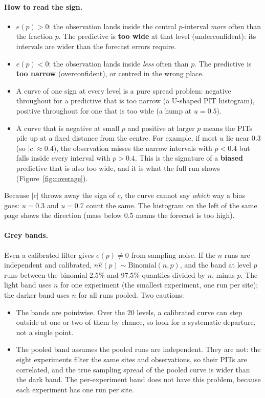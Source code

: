 \documentclass[11pt]{article}
\begin{document}
\paragraph{How to read the sign.}
\begin{itemize}
  \item $e(p) > 0$: the observation lands inside the central $p$-interval \emph{more}
  often than the fraction $p$. The predictive is \textbf{too wide} at that level
  (underconfident): its intervals are wider than the forecast errors require.
  \item $e(p) < 0$: the observation lands inside \emph{less} often than $p$. The
  predictive is \textbf{too narrow} (overconfident), or centred in the wrong place.
  \item A curve of one sign at every level is a pure spread problem: negative throughout
  for a predictive that is too narrow (a U-shaped PIT histogram), positive throughout for
  one that is too wide (a hump at $u = 0.5$).
  \item A curve that is negative at small $p$ and positive at larger $p$ means the PITs
  pile up at a fixed distance from the centre. For example, if most $u$ lie near $0.3$
  (so $|c| \approx 0.4$), the observation misses the narrow intervals with $p < 0.4$ but
  falls inside every interval with $p > 0.4$. This is the signature of a \textbf{biased}
  predictive that is also too wide, and it is what the full run shows (Figure~\ref{fig:coverage}).
\end{itemize}
Because $|c|$ throws away the sign of $c$, the curve cannot say \emph{which} way a bias
goes: $u = 0.3$ and $u = 0.7$ count the same. The histogram on the left of the same page
shows the direction (mass below $0.5$ means the forecast is too high).

\paragraph{Grey bands.} Even a calibrated filter gives $e(p) \neq 0$ from sampling
noise. If the $n$ runs are independent and calibrated, $n\hat\kappa(p) \sim
\mathrm{Binomial}(n, p)$, and the band at level $p$ runs between the binomial 2.5\% and
97.5\% quantiles divided by $n$, minus $p$. The light band uses $n$ for one experiment
(the smallest experiment, one run per site); the darker band uses $n$ for all runs pooled.
Two cautions:
\begin{itemize}
  \item The bands are pointwise. Over the 20 levels, a calibrated curve can step outside
  at one or two of them by chance, so look for a systematic departure, not a single point.
  \item The pooled band assumes the pooled runs are independent. They are not: the eight
  experiments filter the same sites and observations, so their PITs are correlated, and
  the true sampling spread of the pooled curve is wider than the dark band. The
  per-experiment band does not have this problem, because each experiment has one run
  per site.
\end{itemize}
\end{document}
